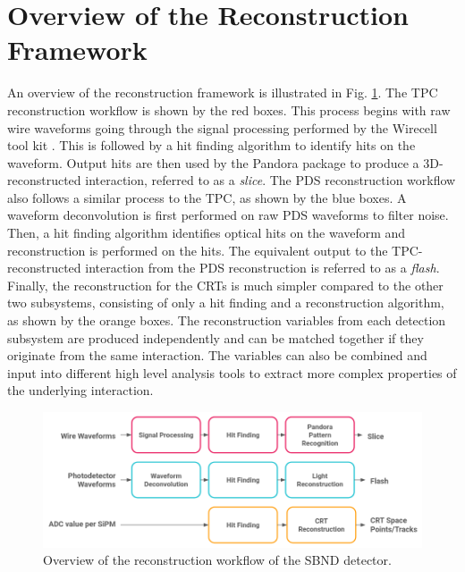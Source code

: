 
\section{Overview of the Reconstruction Framework}
\label{sec:reco_overview}

An overview of the reconstruction framework is illustrated in Fig. \ref{fig:Reco_Workflow}.
The TPC reconstruction workflow is shown by the red boxes.
This process begins with raw wire waveforms going through the signal processing performed by the Wirecell tool kit \cite{wirecell}.
This is followed by a hit finding algorithm to identify hits on the waveform.
Output hits are then used by the Pandora package \cite{pandora} to produce a 3D-reconstructed interaction, referred to as a \textit{slice}.
The PDS reconstruction workflow also follows a similar process to the TPC, as shown by the blue boxes.
A waveform deconvolution is first performed on raw PDS waveforms to filter noise.
Then, a hit finding algorithm identifies optical hits on the waveform and reconstruction is performed on the hits.
The equivalent output to the TPC-reconstructed interaction from the PDS reconstruction is referred to as a \textit{flash}.
Finally, the reconstruction for the CRTs is much simpler compared to the other two subsystems, consisting of only a hit finding and a reconstruction algorithm, as shown by the orange boxes.
The reconstruction variables from each detection subsystem are produced independently and can be matched together if they originate from the same interaction. 
The variables can also be combined and input into different high level analysis tools to extract more complex properties of the underlying interaction. 

\begin{figure}[htbp!] 
\centering    
\includegraphics[width=1.0\textwidth]{Reco_Workflow}
\caption[Reconstruction Framework of SBND]{
Overview of the reconstruction workflow of the SBND detector.
}
\label{fig:Reco_Workflow}
\end{figure}

